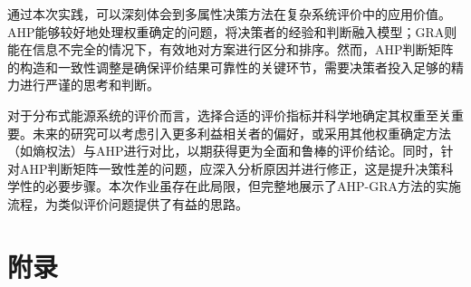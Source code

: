 \documentclass[12pt]{ctexart}
\begin{document}
通过本次实践，可以深刻体会到多属性决策方法在复杂系统评价中的应用价值。AHP能够较好地处理权重确定的问题，将决策者的经验和判断融入模型；GRA则能在信息不完全的情况下，有效地对方案进行区分和排序。然而，AHP判断矩阵的构造和一致性调整是确保评价结果可靠性的关键环节，需要决策者投入足够的精力进行严谨的思考和判断。

对于分布式能源系统的评价而言，选择合适的评价指标并科学地确定其权重至关重要。未来的研究可以考虑引入更多利益相关者的偏好，或采用其他权重确定方法（如熵权法）与AHP进行对比，以期获得更为全面和鲁棒的评价结论。同时，针对AHP判断矩阵一致性差的问题，应深入分析原因并进行修正，这是提升决策科学性的必要步骤。本次作业虽存在此局限，但完整地展示了AHP-GRA方法的实施流程，为类似评价问题提供了有益的思路。

\section{附录}
\end{document}
